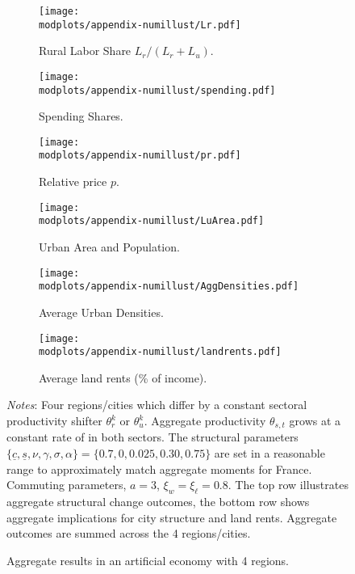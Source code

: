 \documentclass[11pt]{report}
\newcommand{\round}{revision3}  %
\newcommand{\modplots}{../../output/model/plots/\round}
\newcommand{\pthree}{0.37}  %
\newcommand{\parboxadjust}{1.1}
\begin{document}
\begin{figure}[h]
	\begin{adjustbox}{center}
		\parbox{\parboxadjust\textwidth}{\lineskip=0pt
			
			\begin{subfigure}{\pthree\textwidth}
				\texttt{[image: \\modplots/appendix-numillust/Lr.pdf]}
				\caption{Rural Labor Share $L_r/(L_r + L_u)$.\label{B-fig:model-numerical-illust-Lrshare}}
			\end{subfigure}%
			\hspace{3mm}
			\begin{subfigure}{\pthree\textwidth}
				\texttt{[image: \\modplots/appendix-numillust/spending.pdf]}
				\caption{Spending Shares.\label{B-fig:model-numerical-illust-spending}}
			\end{subfigure}
            \hspace{3mm}
			\begin{subfigure}{\pthree\textwidth}
				\texttt{[image: \\modplots/appendix-numillust/pr.pdf]}
				\caption{Relative price $p$.\label{B-fig:model-numerical-illust-pr}}
			\end{subfigure}
			
			\begin{subfigure}{\pthree\textwidth}
				\texttt{[image: \\modplots/appendix-numillust/LuArea.pdf]}
				\caption{Urban Area and Population.\label{B-fig:model-numerical-illust-LuArea}}
			\end{subfigure}%
			\hspace{3mm}
			\begin{subfigure}{\pthree\textwidth}
				\texttt{[image: \\modplots/appendix-numillust/AggDensities.pdf]}
				\caption{Average Urban Densities.\label{B-fig:model-numerical-illust-densities}}
			\end{subfigure}%
			\hspace{3mm}
			\begin{subfigure}{\pthree\textwidth}
				\texttt{[image: \\modplots/appendix-numillust/landrents.pdf]}
				\caption{Average land rents (\% of income).\label{B-fig:model-numerical-illust-rents}}
			\end{subfigure}%
		}
	\end{adjustbox}
    \caption{Aggregate results in an artificial economy with 4 regions.\label{B-fig:model-numerical-illust}}
	{\footnotesize \textit{Notes}: Four regions/cities which differ by a constant sectoral productivity shifter $\theta_r^k$ or $\theta_u^k$. Aggregate productivity $\theta_{s,t}$ grows at a constant rate of in both sectors. The structural parameters $\{\underline{c}, \underline{s}, \nu, \gamma, \sigma, \alpha \}=\{0.7, 0, 0.025, 0.30, 0.75\}$ are set in a reasonable range to approximately match aggregate moments for France. Commuting parameters, $a=3$, $\xi_w=\xi_\ell=0.8$. The top row illustrates aggregate structural change outcomes, the bottom row shows aggregate implications for city structure and land rents. Aggregate outcomes are summed across the 4 regions/cities.}
\end{figure}
\end{document}
